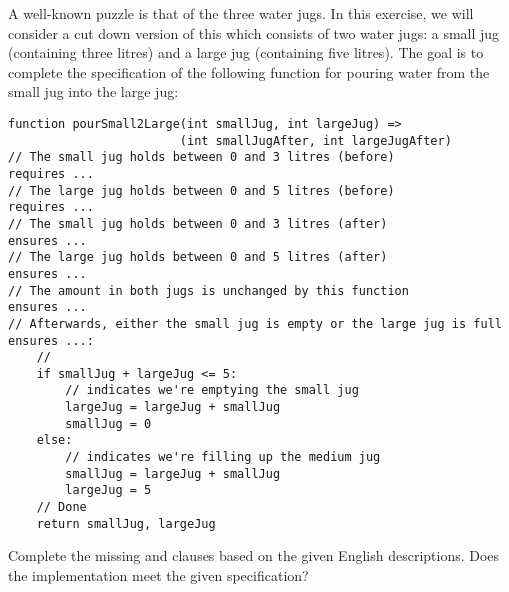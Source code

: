 \begin{ex}
A well-known puzzle is that of the three water jugs.  In this
exercise, we will consider a cut down version of this which consists
of two water jugs: a small jug (containing three litres) and a large
jug (containing five litres).  The goal is to complete the
specification of the following function for pouring water from the
small jug into the large jug:

\begin{lstlisting}
function pourSmall2Large(int smallJug, int largeJug) => 
                        (int smallJugAfter, int largeJugAfter)
// The small jug holds between 0 and 3 litres (before)
requires ...
// The large jug holds between 0 and 5 litres (before)
requires ...
// The small jug holds between 0 and 3 litres (after)
ensures ...
// The large jug holds between 0 and 5 litres (after)
ensures ...
// The amount in both jugs is unchanged by this function
ensures ...
// Afterwards, either the small jug is empty or the large jug is full
ensures ...:
    //
    if smallJug + largeJug <= 5:
        // indicates we're emptying the small jug
        largeJug = largeJug + smallJug
        smallJug = 0
    else:
        // indicates we're filling up the medium jug    
        smallJug = largeJug + smallJug
        largeJug = 5
    // Done
    return smallJug, largeJug
\end{lstlisting}
Complete the missing  and 
clauses based on the given English descriptions.  Does the implementation meet the given specification?
\end{ex}
